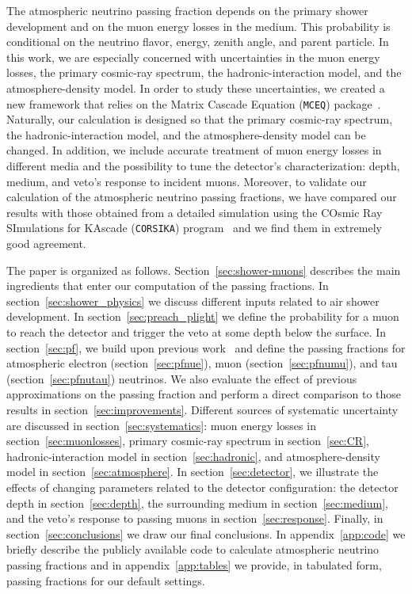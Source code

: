 \documentclass[aps,prd,showpacs,letterpaper,onecolumn,longbibliography,superscriptaddress,notitlepage,nofootinbib]{revtex4-1}%
\newcommand{\MCEq}{\texttt{MCE{\scriptsize Q}}}
\newcommand{\CORSIKA}{\texttt{CORSIKA}}
\begin{document}
The atmospheric neutrino passing fraction depends on the primary shower development and on the muon energy losses in the medium. This probability is conditional on the neutrino flavor, energy, zenith angle, and parent particle. In this work, we are especially concerned with uncertainties in the muon energy losses, the primary cosmic-ray spectrum, the hadronic-interaction model, and the atmosphere-density model. In order to study these uncertainties, we created a new framework that relies on the Matrix Cascade Equation (\MCEq) package~\cite{MCEq, Fedynitch:2015zma, Fedynitch:2018vfe}. Naturally, our calculation is designed so that the primary cosmic-ray spectrum, the hadronic-interaction model, and the atmosphere-density model can be changed. In addition, we include accurate treatment of muon energy losses in different media and the possibility to tune the detector's characterization: depth, medium, and veto's response to incident muons. Moreover, to validate our calculation of the atmospheric neutrino passing fractions, we have compared our results with those obtained from a detailed simulation using the COsmic Ray SImulations for KAscade (\CORSIKA{}) program~\cite{Heck:1998vt, Heck:2018} and we find them in extremely good agreement. 

The paper is organized as follows. Section~\ref{sec:shower-muons} describes the main ingredients that enter our computation of the passing fractions. In section~\ref{sec:shower_physics} we discuss different inputs related to air shower development. In section~\ref{sec:preach_plight} we define the probability for a muon to reach the detector and trigger the veto at some depth below the surface. In section~\ref{sec:pf}, we build upon previous work~\cite{Schonert:2008is, Gaisser:2014bja} and define the passing fractions for atmospheric electron (section~\ref{sec:pfnue}), muon (section~\ref{sec:pfnumu}), and tau (section~\ref{sec:pfnutau}) neutrinos. We also evaluate the effect of previous approximations on the passing fraction and perform a direct comparison to those results in section~\ref{sec:improvements}. Different sources of systematic uncertainty are discussed in section~\ref{sec:systematics}: muon energy losses in section~\ref{sec:muonlosses}, primary cosmic-ray spectrum in section~\ref{sec:CR}, hadronic-interaction model in section~\ref{sec:hadronic}, and atmosphere-density model in section~\ref{sec:atmosphere}. In section~\ref{sec:detector}, we illustrate the effects of changing parameters related to the detector configuration: the detector depth in section~\ref{sec:depth}, the surrounding medium in section~\ref{sec:medium}, and the veto's response to passing muons in section~\ref{sec:response}. Finally, in section~\ref{sec:conclusions} we draw our final conclusions. In appendix~\ref{app:code} we briefly describe the publicly available code to calculate atmospheric neutrino passing fractions and in appendix~\ref{app:tables} we provide, in tabulated form, passing fractions for our default settings.
\end{document}
